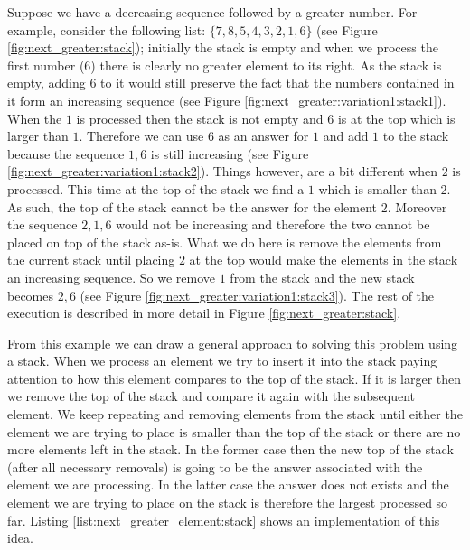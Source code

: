 Suppose we have a decreasing sequence followed by a greater number. For example, consider the
following list: $\{7,8,5, 4, 3, 2, 1, 6\}$ (see Figure \ref{fig:next_greater:stack});
initially the stack is empty and when we process the
first number ($6$) there  is clearly no greater element to its right. As the stack is empty,
adding $6$ to it would still preserve the fact that the numbers contained in it form an increasing
sequence (see Figure \ref{fig:next_greater:variation1:stack1}).
When the $1$ is processed then the stack is not empty and $6$ is at the top which is larger
than $1$. Therefore we can use $6$ as an answer for $1$ and add $1$ to the stack because the
sequence $1,6$ is still increasing (see Figure \ref{fig:next_greater:variation1:stack2}). Things however, are a bit different when $2$ is processed. This
time at the top of the stack we find a $1$ which is smaller than $2$. As such,  the top of the
stack cannot be the answer for the element $2$. Moreover the sequence $2,1,6$ would not be
increasing and therefore the two cannot be placed on top of the stack as-is. What we do here is remove
the elements from the current stack until placing $2$ at the top
would make the elements in the stack an
increasing sequence. 
So we remove $1$ from the stack and the new stack becomes 
$2,6$ (see Figure \ref{fig:next_greater:variation1:stack3}). 
The rest of the execution is described in more detail in Figure \ref{fig:next_greater:stack}.


From this example we can draw a general approach to solving this problem using a stack. 
When we process an element we try to insert it into the stack paying attention to how this element compares to the top of the stack.
If it is larger then we remove the top of the stack and compare it again with the subsequent element. 
We keep repeating and removing elements from the stack until either the element we are 
trying to place is smaller than the top of the stack or there are no more elements left in the stack.
In the former case then the new top of the stack (after all necessary removals)
is going to be the answer associated with the element we are processing.
In the latter case the answer does not exists and the element we are trying to place on the stack
is therefore the largest processed so far.
Listing \ref{list:next_greater_element:stack} shows an implementation of this idea.





